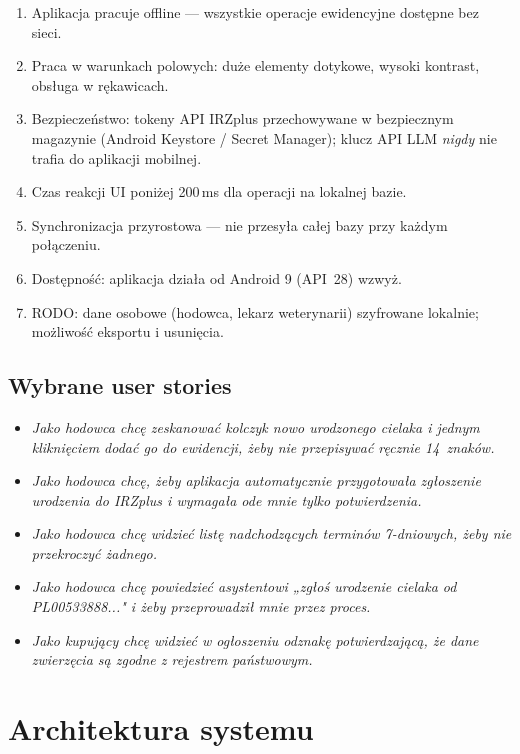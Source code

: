 \documentclass[11pt,a4paper]{article}
\begin{document}
\begin{enumerate}
  \item[\textbf{N1}] Aplikacja pracuje offline --- wszystkie operacje ewidencyjne dostępne bez sieci.
  \item[\textbf{N2}] Praca w warunkach polowych: duże elementy dotykowe, wysoki kontrast, obsługa w rękawicach.
  \item[\textbf{N3}] Bezpieczeństwo: tokeny API IRZplus przechowywane w bezpiecznym magazynie (Android Keystore / Secret Manager); klucz API LLM \emph{nigdy} nie trafia do aplikacji mobilnej.
  \item[\textbf{N4}] Czas reakcji UI poniżej 200\,ms dla operacji na lokalnej bazie.
  \item[\textbf{N5}] Synchronizacja przyrostowa --- nie przesyła całej bazy przy każdym połączeniu.
  \item[\textbf{N6}] Dostępność: aplikacja działa od Android 9 (API~28) wzwyż.
  \item[\textbf{N7}] RODO: dane osobowe (hodowca, lekarz weterynarii) szyfrowane lokalnie; możliwość eksportu i usunięcia.
\end{enumerate}

\subsection{Wybrane user stories}

\begin{itemize}
  \item \emph{Jako hodowca chcę zeskanować kolczyk nowo urodzonego cielaka i jednym kliknięciem dodać go do ewidencji, żeby nie przepisywać ręcznie 14~znaków.}
  \item \emph{Jako hodowca chcę, żeby aplikacja automatycznie przygotowała zgłoszenie urodzenia do IRZplus i wymagała ode mnie tylko potwierdzenia.}
  \item \emph{Jako hodowca chcę widzieć listę nadchodzących terminów 7-dniowych, żeby nie przekroczyć żadnego.}
  \item \emph{Jako hodowca chcę powiedzieć asystentowi „zgłoś urodzenie cielaka od PL00533888..." i żeby przeprowadził mnie przez proces.}
  \item \emph{Jako kupujący chcę widzieć w ogłoszeniu odznakę potwierdzającą, że dane zwierzęcia są zgodne z rejestrem państwowym.}
\end{itemize}

\section{Architektura systemu}
\end{document}
